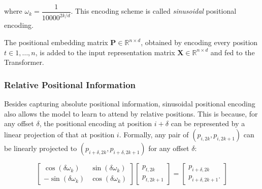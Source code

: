 where $\omega_k =\dfrac{1}{10000^{2k/d}}$. This encoding scheme is called \textit{sinusoidal} positional encoding.

The positional embedding matrix $\bm{P} \in \mathbb{R}^{n \times d}$, obtained by encoding every position $t \in {1, \ldots, n}$, is added to the input representation matrix $\bm{X} \in \mathbb{R}^{n \times d}$ and fed to the Transformer.



\subsubsection{Relative Positional Information}

Besides capturing absolute positional information, sinusoidal positional encoding also allows the model to learn to attend by relative positions. This is because, for any offset $\delta$, the positional encoding at position $i + \delta$ can be represented by a linear projection of that at position $i$. Formally, any pair of $(p_{i, 2k}, p_{i, 2k+1})$ can be linearly projected to $(p_{i + \delta, 2k}, p_{i + \delta, 2k+1})$ for any offset $\delta$:

\begin{equation}
    \begin{bmatrix}
        \cos(\delta \omega_k)  & \sin(\delta \omega_k) \\
        -\sin(\delta \omega_k) & \cos(\delta \omega_k)
    \end{bmatrix}
    \begin{bmatrix}
        p_{t, 2k}   \\
        p_{t, 2k+1}
    \end{bmatrix}
    = \begin{bmatrix}
        p_{i + \delta, 2k}   \\
        p_{i + \delta, 2k+1}.
    \end{bmatrix}
\end{equation}

